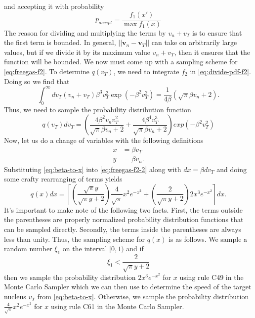 and accepting it with probability
\begin{equation}
  \label{eq:freegas-accept}
  p_{accept} = \frac{f_1(x')}{\max f_1(x)}
\end{equation}
The reason for dividing and multiplying the terms by $v_n + v_T$ is to ensure
that the first term is bounded. In general, $|| \mathbf{v}_n - \mathbf{v}_T ||$
can take on arbitrarily large values, but if we divide it by its maximum value
$v_n + v_T$, then it ensures that the function will be bounded. We now must come
up with a sampling scheme for \eqref{eq:freegas-f2}. To determine $q(v_T)$, we
need to integrate $f_2$ in \eqref{eq:divide-pdf-f2}. Doing so we find that
\begin{equation}
  \label{eq:integrate-f2}
  \int_0^{\infty} dv_T (v_n + v_T) \beta^3 v_T^2 \exp \left ( -\beta^2 v_T^2
  \right ) = \frac{1}{4\beta} \left ( \sqrt{\pi} \beta v_n + 2 \right ).
\end{equation}
Thus, we need to sample the probability distribution function
\begin{equation}
  \label{eq:freegas-f2-2}
  q(v_T) dv_T = \left ( \frac{4\beta^2 v_n v_T^2}{\sqrt{\pi} \beta v_n + 2} +
  \frac{4\beta^4 v_T^3}{\sqrt{\pi} \beta v_n + 2} \right ) exp \left (
  -\beta^2 v_T^2 \right )
\end{equation}
Now, let us do a change of variables with the following definitions
\begin{equation}
  \label{eq:beta-to-x}
  \begin{split}
    x &= \beta v_T \\
    y &= \beta v_n.
  \end{split}
\end{equation}
Substituting \eqref{eq:beta-to-x} into \eqref{eq:freegas-f2-2} along with $dx =
\beta dv_T$ and doing some crafty rearranging of terms yields
\begin{equation}
  \label{eq:freegas-f2-3}
  q(x) dx = \left [ \left ( \frac{\sqrt{\pi} y}{\sqrt{\pi} y + 2} \right )
    \frac{4}{\sqrt{\pi}} x^2 e^{-x^2} + \left ( \frac{2}{\sqrt{\pi} y + 2}
    \right ) 2x^3 e^{-x^2} \right ] dx.
\end{equation}
It's important to make note of the following two facts. First, the terms outside
the parentheses are properly normalized probability distribution functions that
can be sampled directly. Secondly, the terms inside the parentheses are always
less than unity. Thus, the sampling scheme for $q(x)$ is as follows. We
sample a random number $\xi_1$ on the interval $[0,1)$ and if
\begin{equation}
  \label{eq:freegas-alpha}
  \xi_1 < \frac{2}{\sqrt{\pi} y + 2}
\end{equation}
then we sample the probability distribution $2x^3 e^{-x^2}$ for $x$ using rule
C49 in the Monte Carlo Sampler \cite{lanl-everett-1983} which we can then use to
determine the speed of the target nucleus $v_T$ from
\eqref{eq:beta-to-x}. Otherwise, we sample the probability distribution
$\frac{4}{\sqrt{\pi}} x^2 e^{-x^2}$ for $x$ using rule C61 in the Monte Carlo
Sampler.

